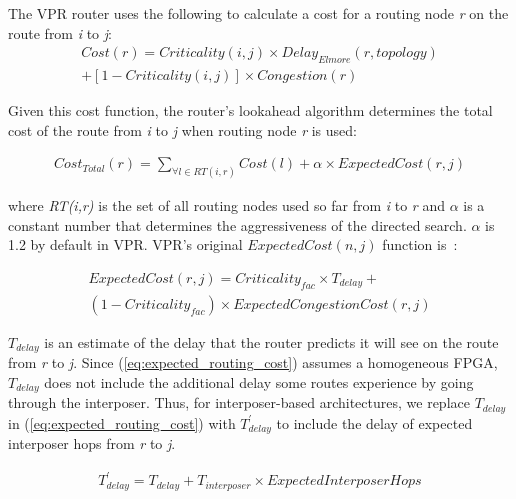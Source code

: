 \documentclass[journal]{IEEEtran}
\begin{document}
The VPR router uses the following to calculate a cost for a routing node \textit{r} on the route from \textit{i} to \textit{j}:
\setlength{\arraycolsep}{0.0em}
\begin{multline}
\label{eq:routing_cost}
Cost(r) = Criticality(i,j) \times Delay_{Elmore}(r, topology) \\ + [1-Criticality(i,j)] \times Congestion(r)
\end{multline}
\setlength{\arraycolsep}{5pt}

Given this cost function, the router's lookahead algorithm determines the total cost of the route from \textit{i} to \textit{j} when routing node \textit{r} is used:

\setlength{\arraycolsep}{0.0em}
\begin{multline}
\label{eq:lookahead_cost}
Cost_{Total}(r) = \sum_{\forall l \in RT(i,r)} Cost(l) + \alpha \times ExpectedCost(r,j)
\end{multline}
\setlength{\arraycolsep}{5pt}

where \textit{RT(i,r)} is the set of all routing nodes used so far from \textit{i} to \textit{r} and $\alpha$ is a constant number that determines the aggressiveness of the directed search. $\alpha$ is 1.2 by default in VPR. VPR's original $ExpectedCost(n,j)$ function is~\cite{betz1999architecture}: 

\setlength{\arraycolsep}{0.0em}
\begin{multline}
\label{eq:expected_routing_cost}
ExpectedCost(r,j) = Criticality_{fac} \times T_{delay} + \\(1 - Criticality_{fac}) \times ExpectedCongestionCost(r,j)
\end{multline}
\setlength{\arraycolsep}{5pt}

$T_{delay}$ is an estimate of the delay that the router predicts it will see on the route from \textit{r} to \textit{j}. Since (\ref{eq:expected_routing_cost}) assumes a homogeneous FPGA, $T_{delay}$ does not include the additional delay some routes experience by going through the interposer. Thus, for interposer-based architectures, we replace $T_{delay}$ in (\ref{eq:expected_routing_cost}) with $T^\prime_{delay}$ to include the delay of expected interposer hops from \textit{r} to \textit{j}.

\begin{multline}
\label{eq:tdelay}
T^\prime_{delay} = T_{delay} + T_{interposer} \times ExpectedInterposerHops
\end{multline}
\setlength{\arraycolsep}{5pt}
\end{document}
